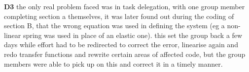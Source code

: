 \textbf{D3} the only real problem faced was in task delegation, with one group member completing 
section a themselves, it was later found out during the coding of section B, that the 
wrong equation was used in defining the system (eg a non-linear spring was used in place
of an elastic one). this set the group back a few days while effort had to be redirected
to correct the error, linearise again and redo transfer functions and rewrite certain
areas of affected code, but the group members were able to pick up on this and correct 
it in a timely manner.